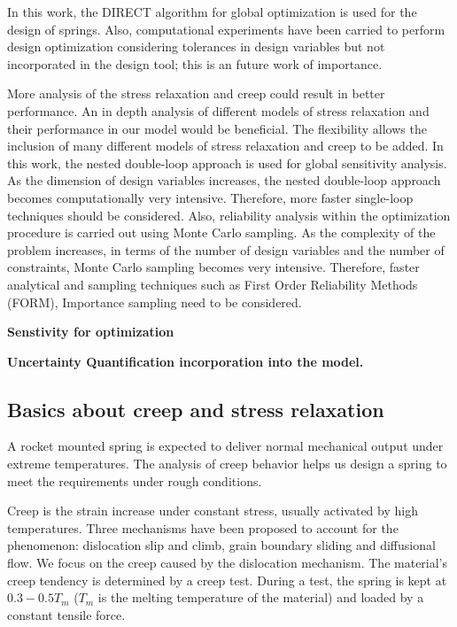 \documentclass[10pt]{article}
\begin{document}
In this work, the DIRECT algorithm for global optimization is used for the design of springs. Also, computational experiments have been carried to perform design optimization considering tolerances in design variables but not incorporated in the design tool; this is an future work of importance. 

More analysis of the stress relaxation and creep could result in better performance. An in depth analysis of different models of stress relaxation and their performance in our model would be beneficial. The flexibility allows the inclusion of many different models of stress relaxation and creep to be added. In this work, the nested double-loop approach is used for global sensitivity analysis. As the dimension of design variables increases, the nested double-loop approach becomes computationally very intensive. Therefore, more faster single-loop techniques should be considered. Also, reliability analysis within the optimization procedure is carried out using Monte Carlo sampling. As the complexity of the problem increases, in terms of the number of design variables and the number of constraints, Monte Carlo sampling becomes very intensive. Therefore, faster analytical and sampling techniques such as First Order Reliability Methods (FORM), Importance sampling need to be considered.


\textbf{Senstivity for optimization}


\textbf{Uncertainty Quantification incorporation into the model.}



\subsection{Basics about creep and stress relaxation}
\label{sec:stress}
A rocket mounted spring is expected to deliver normal mechanical output under extreme temperatures. The analysis of creep behavior helps us design a spring to meet the requirements under rough conditions.

Creep is the strain increase under constant stress, usually activated by high temperatures. Three mechanisms have been proposed to account for the phenomenon: dislocation slip and climb, grain boundary sliding and diffusional flow. We focus on the creep caused by the dislocation mechanism. The material's creep tendency is determined by a creep test. During a test, the spring is kept at $0.3-0.5T_m$ ($T_m$ is the melting temperature of the material) and loaded by a constant tensile force.
\end{document}
